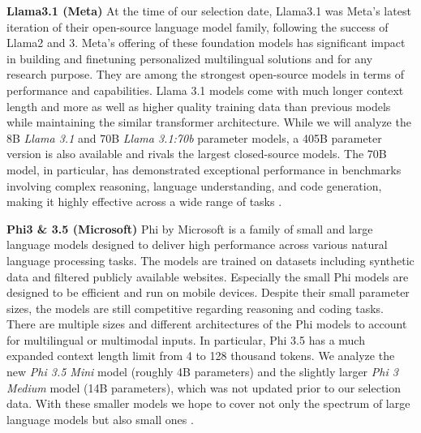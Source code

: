\par \textbf{Llama3.1 (Meta)} At the time of our selection date, Llama3.1 was Meta's latest iteration of their open-source language model family, following the success of Llama2 and 3. Meta's offering of these foundation models has significant impact in building and finetuning personalized multilingual solutions and for any research purpose. They are among the strongest open-source models in terms of performance and capabilities. Llama 3.1 models come with much longer context length and more as well as higher quality training data than previous models while maintaining the similar transformer architecture. While we will analyze the 8B \textit{Llama 3.1} and 70B \textit{Llama 3.1:70b} parameter models, a 405B parameter version is also available and rivals the largest closed-source models. The 70B model, in particular, has demonstrated exceptional performance in benchmarks involving complex reasoning, language understanding, and code generation, making it highly effective across a wide range of tasks \parencite{dubey2024llama,meta2024llama31}.

\par \textbf{Phi3 \& 3.5 (Microsoft)} Phi by Microsoft is a family of small and large language models designed to deliver high performance across various natural language processing tasks. The models are trained on datasets including synthetic data and filtered publicly available websites. Especially the small Phi models are designed to be efficient and run on mobile devices. Despite their small parameter sizes, the models are still competitive regarding reasoning and coding tasks. There are multiple sizes and different architectures of the Phi models to account for multilingual or multimodal inputs. In particular, Phi 3.5 has a much expanded context length limit from 4 to 128 thousand tokens. We analyze the new \textit{Phi 3.5 Mini} model (roughly 4B parameters) and the slightly larger \textit{Phi 3 Medium} model (14B parameters), which was not updated prior to our selection data. With these smaller models we hope to cover not only the spectrum of large language models but also small ones \parencite{abdin2024phi}.

